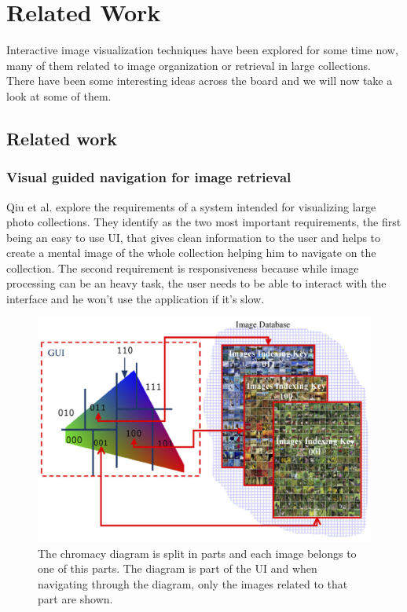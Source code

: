 \chapter{Related Work}
\label{chapter:related-work}


Interactive image visualization techniques have been explored for some time now, many of them related to image organization or retrieval in large collections. There have been some interesting ideas across the board and we will now take a look at some of them.


\section{Related work}

\subsection{Visual guided navigation for image retrieval} %
\label{sub:Qiu}

Qiu et al. \cite{Qiu:2007p1207} explore the requirements of a system intended for visualizing large photo collections. They identify as the two most important requirements, the first being an easy to use \ac{UI}, that gives clean information to the user and helps to create a mental image of the whole collection helping him to navigate on the collection. The second requirement is responsiveness because while image processing can be an heavy task, the user needs to be able to interact with the interface and he won't use the application if it's slow. 

\begin{figure}[ht]
	\centering
		\includegraphics[width=0.6\columnwidth]{imgs-RelatedWork/Qiu-2007p1207.png}
	\caption{The chromacy diagram is split in parts and each image belongs to one of this parts. The diagram is part of the \ac{UI} and  when navigating through the diagram, only the images related to that part are shown.}
	\label{fig:qiu1}
\end{figure}

